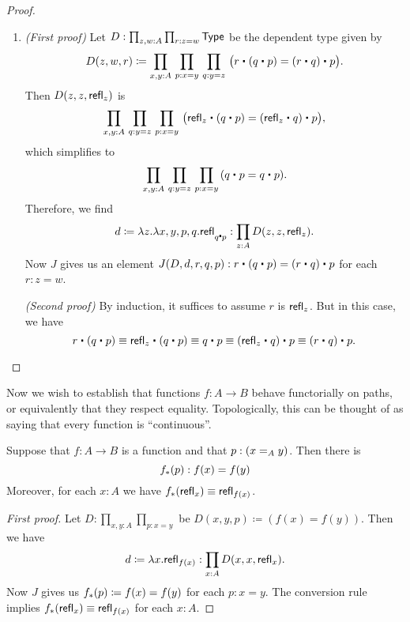 \begin{proof}
\begin{enumerate}
    \noindent \emph{(Second proof)} By induction, it suffices to assume $p$ is $\refl x$.
    But in this case, we have $\opp{\opp{p}}\jdeq \opp{\opp{\refl x}} \jdeq \refl x$.
  \item \emph{(First proof)} Let $D:\prod_{z,w:A} \prod_{r:z=w} \type$ be the dependent type given by
    \begin{equation*}
      D(z,w,r)\coloneqq\prod_{x,y:A}\,\prod_{p:x= y}\,\prod_{q:y= z}\, \big(r\ct (q\ct p)=  (r\ct q)\ct p\big).
    \end{equation*}
    Then $D(z,z,\refl{z})$ is
    \begin{equation*}
      \prod_{x,y:A} \,\prod_{q:y= z} \,\prod_{p:x= y}\, \big(\refl{z}\ct(q\ct p)= (\refl{z}\ct q)\ct p\big),
    \end{equation*}
    which simplifies to
    \begin{equation*}
      \prod_{x,y:A}\,\prod_{q:y= z} \,\prod_{p:x= y}\, (q\ct p= q\ct p).
    \end{equation*}
    Therefore, we find
    \begin{equation*}
      d\coloneqq\lambda z.\lambda x,y,p,q.\refl{q\ct p}:\prod_{z:A} D(z,z,\refl{z}).
    \end{equation*}
    Now $J$ gives us an element $J(D,d,r,q,p):r\ct (q\ct p)= (r\ct q)\ct p$ for each $r:z= w$.

    \noindent \emph{(Second proof)} By induction, it suffices to assume $r$ is $\refl z$.
    But in this case, we have
    \[ r\ct (q\ct p) \jdeq \refl{z}\ct(q\ct p) \jdeq q\ct p \jdeq (\refl{z}\ct q)\ct p
    \jdeq (r\ct q)\ct p.\qedhere
    \]
  \end{enumerate}
\end{proof}

Now we wish to establish that functions $f:A\to B$ behave functorially on paths, or equivalently that they respect equality.
Topologically, this can be thought of as saying that every function is ``continuous''.

\begin{lem}\label{lem:map}
  Suppose that $f:A\to B$ is a function and that $p:(\id[A]xy)$. Then there is
  \begin{equation*}
    \map f p : f(x)= f(y)
  \end{equation*}
  Moreover, for each $x:A$ we have $\map {f}{\refl{x}}\jdeq \refl{f(x)}$.
\end{lem}

\begin{proof}[First proof]
  Let $D:\prod_{x,y:A} \prod_{p:x=y}$ be $D(x,y,p)\coloneqq (f(x)= f(y))$.
  Then we have
  \begin{equation*}
    d\coloneqq\lambda x.\refl{f(x)}:\prod_{x:A} D(x,x,\refl{x}).
  \end{equation*}
  Now $J$ gives us $\map f p\coloneqq f(x)= f(y)$ for each $p:x= y$.
  The conversion rule implies $\map f{\refl{x}}\jdeq\refl{f(x)}$ for each $x:A$.
\end{proof}

